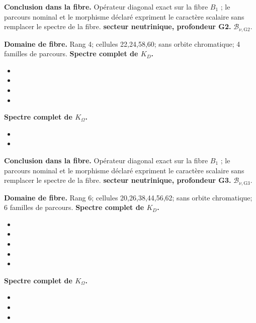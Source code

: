 \noindent\textbf{Conclusion dans la fibre.} Opérateur diagonal exact sur la fibre \(B_1\) ; le parcours nominal et le morphisme déclaré expriment le caractère scalaire sans remplacer le spectre de la fibre.
\medskip
{}
\noindent\textbf{secteur neutrinique, profondeur G2.} \(\mathcal B_{\nu,\mathrm{G2}}\).\par
\noindent\textbf{Domaine de fibre.} Rang 4; cellules 22,24,58,60; sans orbite chromatique; 4 familles de parcours.
\noindent\textbf{Spectre complet de \(K_D\).}
\begin{itemize}
\item \texttt{}
\item \texttt{}
\item \texttt{}
\item \texttt{}
\end{itemize}
\noindent\textbf{Spectre complet de \(K_\Omega\).}
\begin{itemize}
\item \texttt{}
\item \texttt{}
\end{itemize}
\noindent\textbf{Conclusion dans la fibre.} Opérateur diagonal exact sur la fibre \(B_1\) ; le parcours nominal et le morphisme déclaré expriment le caractère scalaire sans remplacer le spectre de la fibre.
\medskip
{}
\noindent\textbf{secteur neutrinique, profondeur G3.} \(\mathcal B_{\nu,\mathrm{G3}}\).\par
\noindent\textbf{Domaine de fibre.} Rang 6; cellules 20,26,38,44,56,62; sans orbite chromatique; 6 familles de parcours.
\noindent\textbf{Spectre complet de \(K_D\).}
\begin{itemize}
\item \texttt{}
\item \texttt{}
\item \texttt{}
\item \texttt{}
\item \texttt{}
\end{itemize}
\noindent\textbf{Spectre complet de \(K_\Omega\).}
\begin{itemize}
\item \texttt{}
\item \texttt{}
\item \texttt{}
\end{itemize}
